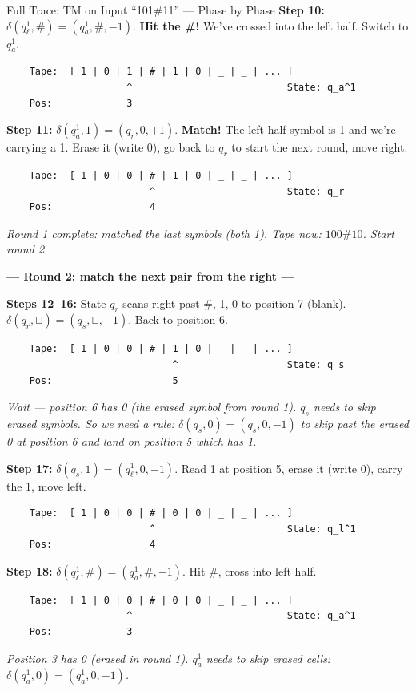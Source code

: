 \documentclass[11pt,a4paper]{article}
\begin{document}
\begin{examplebox}{Full Trace: TM on Input ``101\#11'' --- Phase by Phase}
\textbf{Step 10:} $\delta(q_\ell^1, \#) = (q_a^1, \#, -1)$. \textbf{Hit the \#!} We've crossed into the left half. Switch to $q_a^1$.
\begin{lstlisting}
    Tape:  [ 1 | 0 | 1 | # | 1 | 0 | _ | _ | ... ]
                     ^                           State: q_a^1
    Pos:             3
\end{lstlisting}

\textbf{Step 11:} $\delta(q_a^1, 1) = (q_r, 0, +1)$. \textbf{Match!} The left-half symbol is 1 and we're carrying a 1. Erase it (write 0), go back to $q_r$ to start the next round, move right.
\begin{lstlisting}
    Tape:  [ 1 | 0 | 0 | # | 1 | 0 | _ | _ | ... ]
                         ^                       State: q_r
    Pos:                 4
\end{lstlisting}
\textit{Round 1 complete: matched the last symbols (both 1). Tape now: $100\#10$. Start round 2.}

\textbf{--- Round 2: match the next pair from the right ---}

\textbf{Steps 12--16:} State $q_r$ scans right past $\#$, 1, 0 to position 7 (blank). $\delta(q_r, \sqcup) = (q_s, \sqcup, -1)$. Back to position 6.
\begin{lstlisting}
    Tape:  [ 1 | 0 | 0 | # | 1 | 0 | _ | _ | ... ]
                             ^                   State: q_s
    Pos:                     5
\end{lstlisting}
\textit{Wait --- position 6 has 0 (the erased symbol from round 1). $q_s$ needs to skip erased symbols. So we need a rule: $\delta(q_s, 0) = (q_s, 0, -1)$ to skip past the erased 0 at position 6 and land on position 5 which has 1.}

\textbf{Step 17:} $\delta(q_s, 1) = (q_\ell^1, 0, -1)$. Read 1 at position 5, erase it (write 0), carry the 1, move left.
\begin{lstlisting}
    Tape:  [ 1 | 0 | 0 | # | 0 | 0 | _ | _ | ... ]
                         ^                       State: q_l^1
    Pos:                 4
\end{lstlisting}

\textbf{Step 18:} $\delta(q_\ell^1, \#) = (q_a^1, \#, -1)$. Hit \#, cross into left half.
\begin{lstlisting}
    Tape:  [ 1 | 0 | 0 | # | 0 | 0 | _ | _ | ... ]
                     ^                           State: q_a^1
    Pos:             3
\end{lstlisting}
\textit{Position 3 has 0 (erased in round 1). $q_a^1$ needs to skip erased cells: $\delta(q_a^1, 0) = (q_a^1, 0, -1)$.}


\end{examplebox}
\end{document}
